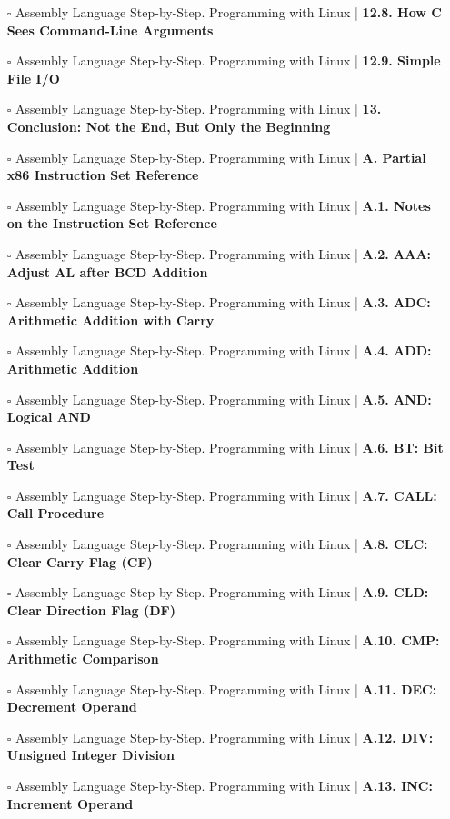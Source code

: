 \documentclass[a4, landscape, 12pt]{article}
\newcommand{\checkbox}{$\square$}%
\begin{document}
\begin{itemize}
{}
\item [\checkbox]  Assembly Language Step-by-Step. Programming with Linux | \textbf{ 12.8. How C Sees Command-Line Arguments
}
\item [\checkbox]  Assembly Language Step-by-Step. Programming with Linux | \textbf{ 12.9. Simple File I/O
}
\item [\checkbox]  Assembly Language Step-by-Step. Programming with Linux | \textbf{ 13. Conclusion: Not the End, But Only the Beginning
}
\item [\checkbox]  Assembly Language Step-by-Step. Programming with Linux | \textbf{ A. Partial x86 Instruction Set Reference
}
\item [\checkbox]  Assembly Language Step-by-Step. Programming with Linux | \textbf{ A.1. Notes on the Instruction Set Reference
}
\item [\checkbox]  Assembly Language Step-by-Step. Programming with Linux | \textbf{ A.2. AAA: Adjust AL after BCD Addition
}
\item [\checkbox]  Assembly Language Step-by-Step. Programming with Linux | \textbf{ A.3. ADC: Arithmetic Addition with Carry
}
\item [\checkbox]  Assembly Language Step-by-Step. Programming with Linux | \textbf{ A.4. ADD: Arithmetic Addition
}
\item [\checkbox]  Assembly Language Step-by-Step. Programming with Linux | \textbf{ A.5. AND: Logical AND
}
\item [\checkbox]  Assembly Language Step-by-Step. Programming with Linux | \textbf{ A.6. BT: Bit Test
}
\item [\checkbox]  Assembly Language Step-by-Step. Programming with Linux | \textbf{ A.7. CALL: Call Procedure
}
\item [\checkbox]  Assembly Language Step-by-Step. Programming with Linux | \textbf{ A.8. CLC: Clear Carry Flag (CF)
}
\item [\checkbox]  Assembly Language Step-by-Step. Programming with Linux | \textbf{ A.9. CLD: Clear Direction Flag (DF)
}
\item [\checkbox]  Assembly Language Step-by-Step. Programming with Linux | \textbf{ A.10. CMP: Arithmetic Comparison
}
\item [\checkbox]  Assembly Language Step-by-Step. Programming with Linux | \textbf{ A.11. DEC: Decrement Operand
}
\item [\checkbox]  Assembly Language Step-by-Step. Programming with Linux | \textbf{ A.12. DIV: Unsigned Integer Division
}
\item [\checkbox]  Assembly Language Step-by-Step. Programming with Linux | \textbf{ A.13. INC: Increment Operand
}
\end{itemize}
\end{document}
